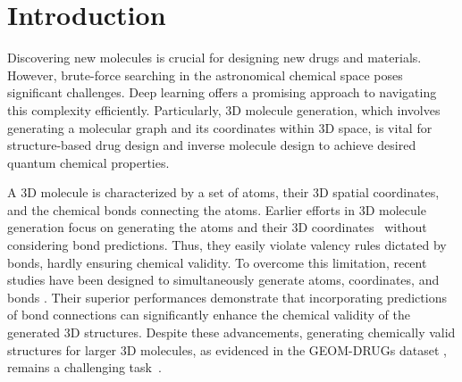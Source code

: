 \section{Introduction}
Discovering new molecules is crucial for designing new drugs and materials. However, brute-force searching in the astronomical chemical space poses significant challenges. Deep learning offers a promising approach to navigating this complexity efficiently. Particularly, 3D molecule generation, which involves generating a molecular graph and its coordinates within 3D space, is vital for structure-based drug design and inverse molecule design to achieve desired quantum chemical properties.



A 3D molecule is characterized by a set of atoms, their 3D spatial coordinates, and the chemical bonds connecting the atoms. Earlier efforts in 3D molecule generation focus on generating the atoms and their 3D coordinates~\citep{EDM, EEGSDE} without considering bond predictions. Thus, they easily violate valency rules dictated by bonds, hardly ensuring chemical validity.
To overcome this limitation, recent studies have been designed to simultaneously generate atoms, coordinates, and bonds \citep{JODO, MiDi}. Their superior performances demonstrate that incorporating predictions of bond connections can significantly enhance the chemical validity of the generated 3D structures.  Despite these advancements, generating chemically valid structures for larger 3D molecules, as evidenced in the GEOM-DRUGs dataset \citep{GEOM}, remains a challenging task~\citep{JODO}.



